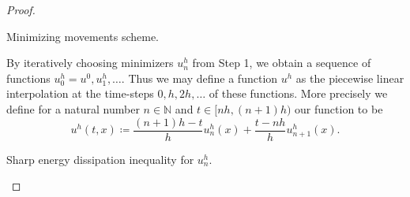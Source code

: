 \begin{proof}
\begin{description}[wide=0pt]
		\item[Step 2:] Minimizing movements scheme.
		
		By iteratively choosing minimizers $ u_{ n }^{ h } $ from Step 1, we 
		obtain a sequence of functions $ u_{ 0 }^{ h } = u^{ 0 }, u_{ 1 }^{ h } 
		, \dotsc $. Thus we may define a function $ u^{ h } $ as the piecewise 
		linear interpolation at the time-steps $ 0, h , 2h, \dotsc $ of these 
		functions. More precisely we define for a natural number $ n \in 
		\mathbb{ N } $ 
		and $ t \in [ nh, (n+1)h ) $ our function to be  
		\begin{equation*}
		u^{ h } ( t , x ) 
		\coloneqq 
		\frac{ ( n + 1 ) h  - t }{ h }
		u_{ n }^{ h } ( x )
		+
		\frac{ t - n h }{ h }
		u_{ n +1 }^{ h } ( x ). 
		\end{equation*}
		
		\item[Step 3:] Sharp energy dissipation inequality for $ u_{ n }^{ h } 
		$.
		

\end{description}
\end{proof}

